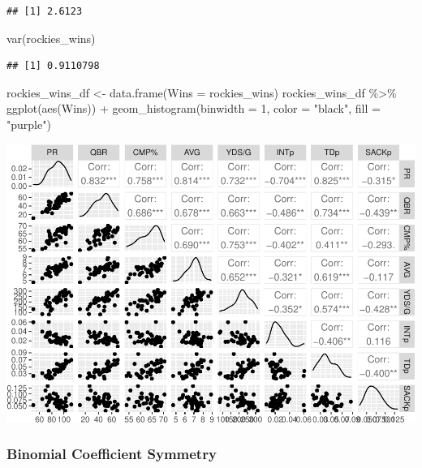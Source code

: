 \documentclass[
  11pt,
]{book}
\newenvironment{Shaded}{\begin{snugshade}}{\end{snugshade}}
\newcommand{\AttributeTok}[1]{\textcolor[rgb]{0.77,0.63,0.00}{#1}}
\newcommand{\DecValTok}[1]{\textcolor[rgb]{0.00,0.00,0.81}{#1}}
\newcommand{\FunctionTok}[1]{\textcolor[rgb]{0.00,0.00,0.00}{#1}}
\newcommand{\NormalTok}[1]{#1}
\newcommand{\OtherTok}[1]{\textcolor[rgb]{0.56,0.35,0.01}{#1}}
\newcommand{\SpecialCharTok}[1]{\textcolor[rgb]{0.00,0.00,0.00}{#1}}
\newcommand{\StringTok}[1]{\textcolor[rgb]{0.31,0.60,0.02}{#1}}
\theoremstyle{definition}
\theoremstyle{definition}
\theoremstyle{definition}
\theoremstyle{definition}
\theoremstyle{remark}
\begin{document}
\begin{verbatim}
## [1] 2.6123
\end{verbatim}

\begin{Shaded}
\begin{Highlighting}[]
\FunctionTok{var}\NormalTok{(rockies\_wins)}
\end{Highlighting}
\end{Shaded}

\begin{verbatim}
## [1] 0.9110798
\end{verbatim}

\begin{Shaded}
\begin{Highlighting}[]
\NormalTok{rockies\_wins\_df }\OtherTok{\textless{}{-}} \FunctionTok{data.frame}\NormalTok{(}\AttributeTok{Wins =}\NormalTok{ rockies\_wins)}
\NormalTok{rockies\_wins\_df }\SpecialCharTok{\%\textgreater{}\%}
    \FunctionTok{ggplot}\NormalTok{(}\FunctionTok{aes}\NormalTok{(Wins)) }\SpecialCharTok{+} \FunctionTok{geom\_histogram}\NormalTok{(}\AttributeTok{binwidth =} \DecValTok{1}\NormalTok{, }\AttributeTok{color =} \StringTok{"black"}\NormalTok{, }\AttributeTok{fill =} \StringTok{"purple"}\NormalTok{)}
\end{Highlighting}
\end{Shaded}

\includegraphics{series_files/figure-latex/unnamed-chunk-24-1.pdf}

\hypertarget{binomial-coefficient-symmetry}{%
\subsubsection{Binomial Coefficient Symmetry}\label{binomial-coefficient-symmetry}}
\end{document}
